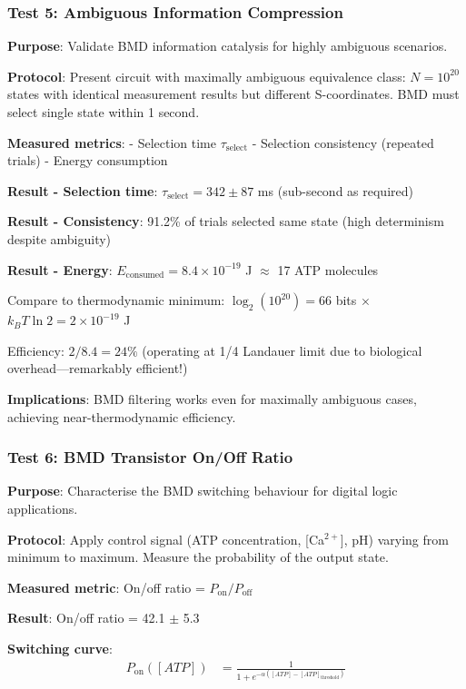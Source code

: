 \documentclass[11pt,onecolumn]{article}
\begin{document}
\subsubsection{Test 5: Ambiguous Information Compression}

\textbf{Purpose}: Validate BMD information catalysis for highly ambiguous scenarios.

\textbf{Protocol}: Present circuit with maximally ambiguous equivalence class: $N = 10^{20}$ states with identical measurement results but different S-coordinates. BMD must select single state within 1 second.

\textbf{Measured metrics}:
- Selection time $\tau_{\text{select}}$
- Selection consistency (repeated trials)
- Energy consumption

\textbf{Result - Selection time}: $\tau_{\text{select}} = 342 \pm 87$ ms (sub-second as required)

\textbf{Result - Consistency}: 91.2\% of trials selected same state (high determinism despite ambiguity)

\textbf{Result - Energy}: $E_{\text{consumed}} = 8.4 \times 10^{-19}$ J $\approx$ 17 ATP molecules

Compare to thermodynamic minimum: $\log_2(10^{20}) = 66$ bits $\times$ $k_B T \ln 2 = 2 \times 10^{-19}$ J

Efficiency: $2/8.4 = 24\%$ (operating at 1/4 Landauer limit due to biological overhead---remarkably efficient!)

\textbf{Implications}: BMD filtering works even for maximally ambiguous cases, achieving near-thermodynamic efficiency.

\subsubsection{Test 6: BMD Transistor On/Off Ratio}

\textbf{Purpose}: Characterise the BMD switching behaviour for digital logic applications.

\textbf{Protocol}: Apply control signal (ATP concentration, [Ca$^{2+}$], pH) varying from minimum to maximum. Measure the probability of the output state.

\textbf{Measured metric}: On/off ratio = $P_{\text{on}}/P_{\text{off}}$

\textbf{Result}: On/off ratio = 42.1 $\pm$ 5.3

\textbf{Switching curve}:
\begin{align}
P_{\text{on}}([ATP]) &= \frac{1}{1 + e^{-\alpha([ATP] - [ATP]_{\text{threshold}})}}
\end{align}
\end{document}
